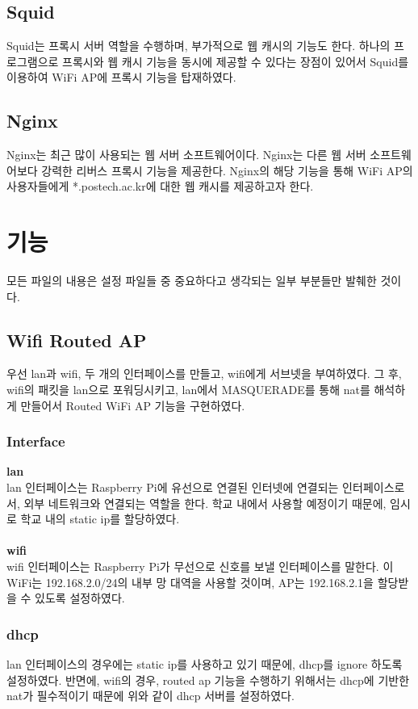 \documentclass{article}
\begin{document}
    \subsection{Squid}
    Squid는 프록시 서버 역할을 수행하며, 부가적으로 웹 캐시의 기능도 한다.
    하나의 프로그램으로 프록시와 웹 캐시 기능을 동시에 제공할 수 있다는 장점이 있어서 Squid를 이용하여 WiFi AP에 프록시 기능을 탑재하였다.
    \subsection{Nginx}
    Nginx는 최근 많이 사용되는 웹 서버 소프트웨어이다. Nginx는 다른 웹 서버 소프트웨어보다 강력한 리버스 프록시 기능을 제공한다.
    Nginx의 해당 기능을 통해 WiFi AP의 사용자들에게 *.postech.ac.kr에 대한 웹 캐시를 제공하고자 한다.
    \section{기능}
    모든 파일의 내용은 설정 파일들 중 중요하다고 생각되는 일부 부분들만 발췌한 것이다.
    \subsection{Wifi Routed AP}
    우선 lan과 wifi, 두 개의 인터페이스를 만들고, wifi에게 서브넷을 부여하였다. 그 후, wifi의 패킷을 lan으로 포워딩시키고,
    lan에서 MASQUERADE를 통해 nat를 해석하게 만들어서 Routed WiFi AP 기능을 구현하였다.
    \subsubsection{Interface}
    \textbf{lan}\\
    lan 인터페이스는 Raspberry Pi에 유선으로 연결된 인터넷에 연결되는 인터페이스로서, 외부 네트워크와 연결되는 역할을 한다.
    학교 내에서 사용할 예정이기 때문에, 임시로 학교 내의 static ip를 할당하였다. \\ \\
    \textbf{wifi}\\
    wifi 인터페이스는 Raspberry Pi가 무선으로 신호를 보낼 인터페이스를 말한다. 이 WiFi는 192.168.2.0/24의 내부 망 대역을 사용할 것이며,
    AP는 192.168.2.1을 할당받을 수 있도록 설정하였다.

    \subsubsection{dhcp}
    lan 인터페이스의 경우에는 static ip를 사용하고 있기 때문에, dhcp를 ignore 하도록 설정하였다.
    반면에, wifi의 경우, routed ap 기능을 수행하기 위해서는 dhcp에 기반한 nat가 필수적이기 때문에 위와 같이 dhcp 서버를 설정하였다.
\end{document}
